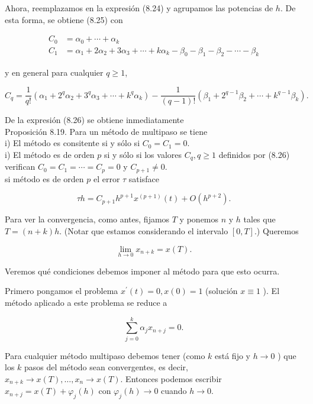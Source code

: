 \documentclass[10pt]{book}
\begin{document}
Ahora, reemplazamos en la expresión (8.24) y agrupamos las potencias de $h$. De esta forma, se obtiene (8.25) con

$$
\begin{aligned}
C_{0} & =\alpha_{0}+\cdots+\alpha_{k} \\
C_{1} & =\alpha_{1}+2 \alpha_{2}+3 \alpha_{3}+\cdots+k \alpha_{k}-\beta_{0}-\beta_{1}-\beta_{2}-\cdots-\beta_{k}
\end{aligned}
$$

y en general para cualquier $q \geq 1$,


\begin{equation*}
C_{q}=\frac{1}{q!}\left(\alpha_{1}+2^{q} \alpha_{2}+3^{q} \alpha_{3}+\cdots+k^{q} \alpha_{k}\right)-\frac{1}{(q-1)!}\left(\beta_{1}+2^{q-1} \beta_{2}+\cdots+k^{q-1} \beta_{k}\right) . \tag{8.26}
\end{equation*}


De la expresión (8.26) se obtiene inmediatamente\\
Proposición 8.19. Para un método de multipaso se tiene\\
i) El método es consitente si y sólo si $C_{0}=C_{1}=0$.\\
i) El método es de orden $p$ si y sólo si los valores $C_{q}, q \geq 1$ definidos por (8.26) verifican $C_{0}=C_{1}=\cdots=C_{p}=0$ y $C_{p+1} \neq 0$.\\
si método es de orden $p$ el error $\tau$ satisface

$$
\tau h=C_{p+1} h^{p+1} x^{(p+1)}(t)+O\left(h^{p+2}\right) .
$$

Para ver la convergencia, como antes, fijamos $T$ y ponemos $n$ y $h$ tales que $T=(n+k) h$. (Notar que estamos considerando el intervalo $[0, T]$.) Queremos

$$
\lim _{h \rightarrow 0} x_{n+k}=x(T) .
$$

Veremos qué condiciones debemos imponer al método para que esto ocurra.

Primero pongamos el problema $x^{\prime}(t)=0, x(0)=1$ (solución $x \equiv 1$ ). El método aplicado a este problema se reduce a

$$
\sum_{j=0}^{k} \alpha_{j} x_{n+j}=0 .
$$

Para cualquier método multipaso debemos tener (como $k$ está fijo y $h \rightarrow 0$ ) que los $k$ pasos del método sean convergentes, es decir, $x_{n+k} \rightarrow x(T), \ldots, x_{n} \rightarrow x(T)$. Entonces podemos escribir $x_{n+j}=x(T)+\varphi_{j}(h)$ con $\varphi_{j}(h) \rightarrow 0$ cuando $h \rightarrow 0$.
\end{document}
